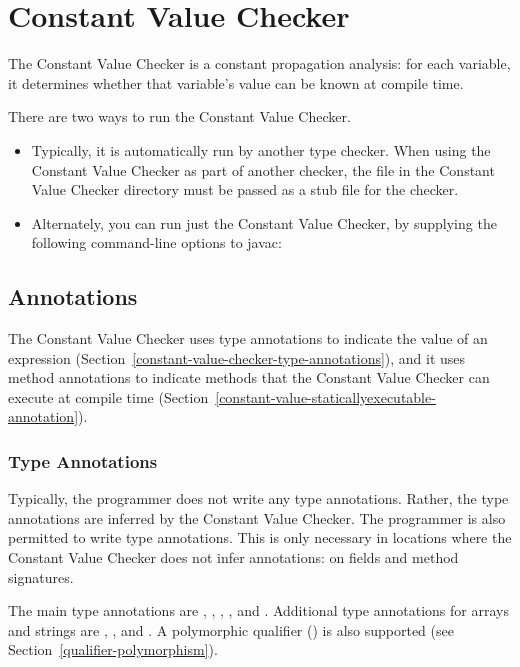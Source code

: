 \htmlhr
\chapter{Constant Value Checker\label{constant-value-checker}}

The Constant Value Checker is a constant propagation analysis: for
each variable, it determines whether that variable's value can be
known at compile time.

There are two ways to run the Constant Value Checker.
\begin{itemize}
\item
Typically, it is automatically run by another type checker.
When using the Constant Value Checker as part of another checker, the
 file in the Constant Value Checker directory must
be passed as a stub file for the checker.
\item
Alternately, you can run just the Constant Value Checker, by
supplying the following command-line options to javac:
\end{itemize}

\section{Annotations\label{constant-value-checker-annotations}}

The Constant Value Checker uses type annotations to indicate the value of
an expression (Section~\ref{constant-value-checker-type-annotations}), and
it uses method annotations to indicate methods that the Constant Value
Checker can execute at compile time
(Section~\ref{constant-value-staticallyexecutable-annotation}).


\subsection{Type Annotations\label{constant-value-checker-type-annotations}}

Typically, the programmer does not write any type annotations.  Rather, the
type annotations are inferred by the Constant Value Checker.
The programmer is also permitted to write type annotations.  This is only necessary in
locations where the Constant Value Checker does not infer annotations:  on fields
and method signatures.

The main type annotations are
,
,
,
, and
.
Additional type annotations for arrays and strings are
,
,
and .
A polymorphic qualifier ()
is also supported (see Section~\ref{qualifier-polymorphism}).

